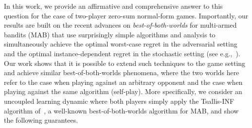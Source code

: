 In this work, we provide an affirmative and comprehensive answer to this question for the case of two-player zero-sum normal-form games.
Importantly, our results are built on the recent advances on \emph{best-of-both-worlds} for multi-armed bandits (MAB) that use surprisingly simple algorithms and analysis to simultaneously achieve the optimal worst-case regret in the adversarial setting and the optimal instance-dependent regret in the stochastic setting (see e.g.,~\citealp{zimmert2021tsallis}).
Our work shows that it is possible to extend such techniques to the game setting and achieve similar best-of-both-worlds phenomena, where the two worlds here refer to the case when playing against an arbitrary opponent and the case when playing against the same algorithm (self-play).
More specifically, we consider an uncoupled learning dynamic where both players simply apply the Tsallis-INF algorithm of~\citet{zimmert2021tsallis}, a well-known best-of-both-worlds algorithm for MAB, and show the following guarantees.

